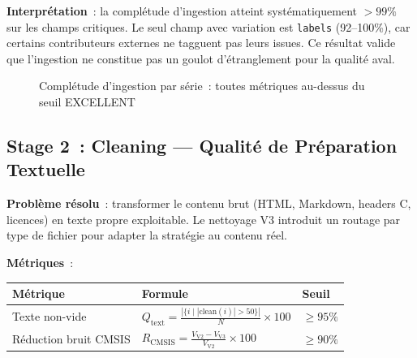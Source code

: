 \textbf{Interprétation}~: la complétude d'ingestion atteint systématiquement $> 99\%$ sur les champs critiques. Le seul champ avec variation est \texttt{labels} (92--100\%), car certains contributeurs externes ne tagguent pas leurs issues. Ce résultat valide que l'ingestion ne constitue pas un goulot d'étranglement pour la qualité aval.

\begin{figure}[H]
\centering
{}
\caption{Complétude d'ingestion par série~: toutes métriques au-dessus du seuil EXCELLENT}
\label{fig:eval_ingestion_chart}
\end{figure}

\subsection{Stage 2~: Cleaning --- Qualité de Préparation Textuelle}
\label{sec:eval_stage2}

\textbf{Problème résolu}~: transformer le contenu brut (HTML, Markdown, headers C, licences) en texte propre exploitable. Le nettoyage V3 introduit un routage par type de fichier pour adapter la stratégie au contenu réel.

\textbf{Métriques}~:

\begin{longtable}{p{4.5cm}p{6cm}p{2cm}}
\toprule
\textbf{Métrique} & \textbf{Formule} & \textbf{Seuil} \\
\midrule
Texte non-vide & $Q_{\text{text}} = \frac{|\{i \mid |\text{clean}(i)| > 50\}|}{N} \times 100$ & $\geq 95\%$ \\
Réduction bruit CMSIS & $R_{\text{CMSIS}} = \frac{V_{\text{V2}} - V_{\text{V3}}}{V_{\text{V2}}} \times 100$ & $\geq 90\%$ \\
\bottomrule
\end{longtable}

